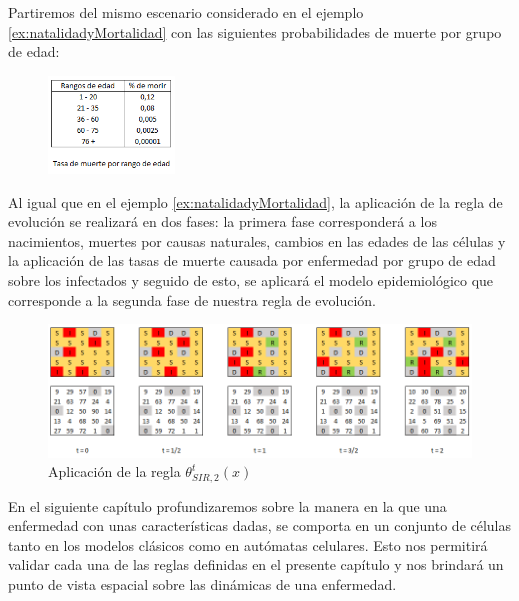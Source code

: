 \begin{example}
Partiremos del mismo escenario considerado en el ejemplo \ref{ex:natalidadyMortalidad} con las siguientes probabilidades de muerte por grupo de edad:

\begin{figure}[h]
  \centering
    \includegraphics[width=0.3\textwidth]{Imagenes/muertePorEnfermedad.PNG}
\end{figure}

Al igual que en el ejemplo \ref{ex:natalidadyMortalidad}, la aplicación de la regla de evolución se realizará en dos fases: la primera fase corresponderá a los nacimientos, muertes por causas naturales, cambios en las edades de las células y la aplicación de las tasas de muerte causada por enfermedad por grupo de edad sobre los infectados y seguido de esto, se aplicará el modelo epidemiológico que corresponde a la segunda fase de nuestra regla de evolución.

\begin{figure}[h]
  \centering
    \includegraphics[width=1\textwidth]{Imagenes/muertePorEnfermedadEvo.PNG}
    \caption{Aplicación de la regla $\theta_{SIR,2}^t(x)$}
\end{figure}
\end{example}

\begin{example}

\end{example}

En el siguiente capítulo profundizaremos sobre la manera en la que una enfermedad con unas características dadas, se comporta en un conjunto de células tanto en los modelos clásicos como en autómatas celulares. Esto nos permitirá validar cada una de las reglas definidas en el presente capítulo y nos brindará un punto de vista espacial sobre las dinámicas de una enfermedad.

